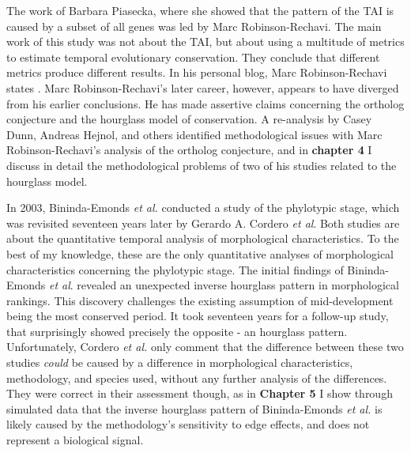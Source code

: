 The work of Barbara Piasecka, where she showed that the pattern of the TAI is caused by a subset of all genes was led by Marc Robinson-Rechavi. The main work of this study was not about the TAI, but about using a multitude of metrics to estimate temporal evolutionary conservation. They conclude that different metrics produce different results. In his personal blog, Marc Robinson-Rechavi states \cite{robinsonrechaviblog}. Marc Robinson-Rechavi's later career, however, appears to have diverged from his earlier conclusions. He has made assertive claims concerning the ortholog conjecture\cite{KryuchkovaMostacci2016} and the hourglass model of conservation\cite{Liu2020,Liu2021,marletaz2018}. A re-analysis by Casey Dunn, Andreas Hejnol, and others identified methodological issues with Marc Robinson-Rechavi's analysis of the ortholog conjecture\cite{Dunn2018}, and in \textbf{chapter 4} I discuss in detail the methodological problems of two of his studies related to the hourglass model.

In 2003, Bininda-Emonds \textit{et al.} conducted a study of the phylotypic stage, which was revisited seventeen years later by Gerardo A. Cordero \textit{et al}\cite{OlafRP2003, Cordero2020}. Both studies are about the quantitative temporal analysis of morphological characteristics. To the best of my knowledge, these are the only quantitative analyses of morphological characteristics concerning the phylotypic stage. The initial findings of Bininda-Emonds \textit{et al}. revealed an unexpected inverse hourglass pattern in morphological rankings. This discovery challenges the existing assumption of mid-development being the most conserved period. It took seventeen years for a follow-up study, that surprisingly showed precisely the opposite - an hourglass pattern. Unfortunately, Cordero \textit{et al.} only comment that the difference between these two studies \textit{could} be caused by a difference in morphological characteristics, methodology, and species used, without any further analysis of the differences. They were correct in their assessment though, as in \textbf{Chapter 5} I show through simulated data that the inverse hourglass pattern of Bininda-Emonds \textit{et al.} is likely caused by the methodology's sensitivity to edge effects, and does not represent a biological signal.

